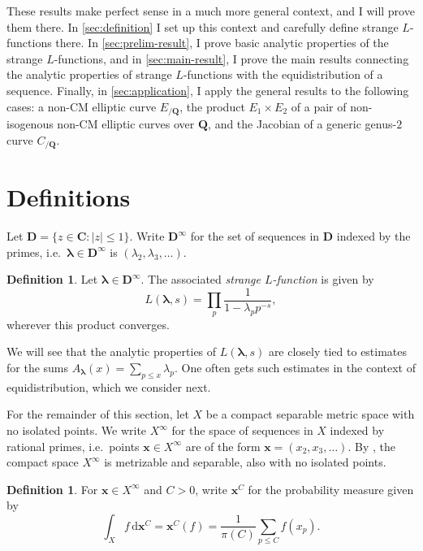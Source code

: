 \documentclass{article}
\newcommand{\bC}{\mathbf{C}}
\newcommand{\bD}{\mathbf{D}}
\newcommand{\blambda}{{\boldsymbol{\lambda}}}
\newcommand{\bQ}{\mathbf{Q}}
\newcommand{\bx}{{\boldsymbol x}}
\newcommand{\dd}{\mathrm{d}}
\theoremstyle{definition}
\newtheorem{definition}[subsection]{Definition}
\begin{document}
These results make perfect sense in a much more general context, and I will 
prove them there. In \autoref{sec:definition} I set up this context and 
carefully define strange $L$-functions there. In \autoref{sec:prelim-result}, I 
prove basic analytic properties of the strange $L$-functions, and in 
\autoref{sec:main-result}, I prove the main results connecting the analytic 
properties of strange $L$-functions with the equidistribution of a sequence. 
Finally, in \autoref{sec:application}, I apply the general results to the 
following cases: a non-CM elliptic curve $E_{/\bQ}$, the product 
$E_1\times E_2$ of a pair of non-isogenous non-CM elliptic curves over $\bQ$, 
and the Jacobian of a generic genus-$2$ curve $C_{/\bQ}$. 





\section{Definitions}\label{sec:definition}

Let $\bD=\{z\in \bC : |z|\leqslant 1\}$. Write $\bD^\infty$ for the set of 
sequences in $\bD$ indexed by the primes, i.e.~$\blambda\in\bD^\infty$ is 
$(\lambda_2,\lambda_3,\dots)$. 

\begin{definition}
Let $\blambda\in\bD^\infty$. The associated \emph{strange $L$-function} is 
given by 
\[
	L(\blambda,s) = \prod_p \frac{1}{1-\lambda_p p^{-s}} ,
\]
wherever this product converges. 
\end{definition}

We will see that the analytic properties of $L(\blambda,s)$ are closely tied to 
estimates for the sums $A_\blambda(x) = \sum_{p\leqslant x} \lambda_p$. One 
often gets such estimates in the context of equidistribution, which we consider 
next.

For the remainder of this section, let $X$ be a compact separable metric space with no 
isolated points. We write $X^\infty$ for the space of sequences in $X$ indexed 
by rational primes, i.e.~points $\bx\in X^\infty$ are of the form 
$\bx=(x_2,x_3,\dots)$. By \cite[Cor.~2.3.16 \& Th.~4.2.2]{engelking-1989}, the 
compact space $X^\infty$ is metrizable and separable, also with no isolated 
points. 

\begin{definition}
For $\bx\in X^\infty$ and $C>0$, write $\bx^C$ for the probability measure 
given by 
\[
	\int_X f\, \dd \bx^C = \bx^C(f) = \frac{1}{\pi(C)} \sum_{p\leqslant C} f(x_p) .
\]
\end{definition}
\end{document}
